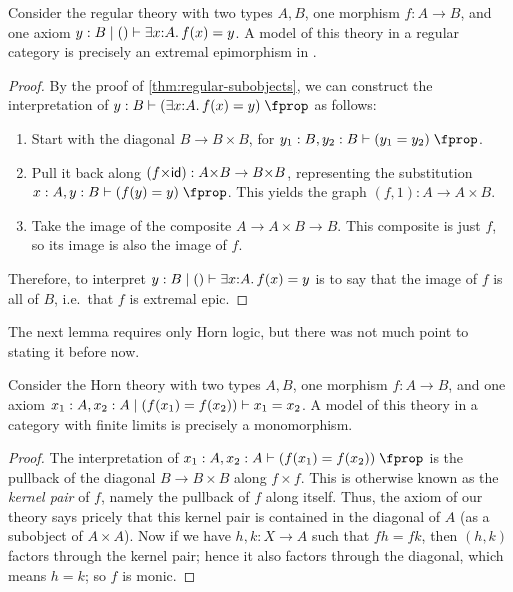 \begin{lem}\label{thm:logic-extremal-epi}
  Consider the regular theory with two types $A,B$, one morphism $f:A\to B$, and one axiom $y:B \cb () \types \exists x:A.f(x)= y$.
  A model of this theory in a regular category \cS is precisely an extremal epimorphism in \cS.
\end{lem}
\begin{proof}
  By the proof of \cref{thm:regular-subobjects}, we can construct the interpretation of $y:B\types (\exists x:A.f(x)= y)\prop$ as follows:
  \begin{enumerate}
  \item Start with the diagonal $B\to B\times B$, for $y_1:B,y_2:B\types (y_1= y_2)\prop$.
  \item Pull it back along $(f\times \idfunc):A\times B\to B\times B$, representing the substitution $x:A,y:B\types (f(y)= y)\prop$.
    This yields the graph $(f,1):A\to A\times B$.
  \item Take the image of the composite $A\to A\times B \to B$.
    This composite is just $f$, so its image is also the image of $f$.
  \end{enumerate}
  Therefore, to interpret $y:B \cb () \types \exists x:A.f(x)= y$ is to say that the image of $f$ is all of $B$, i.e.\ that $f$ is extremal epic.
\end{proof}

The next lemma requires only Horn logic, but there was not much point to stating it before now.

\begin{lem}\label{thm:logic-mono}
  Consider the Horn theory with two types $A,B$, one morphism $f:A\to B$, and one axiom $x_1:A,x_2:A \mid (f(x_1)=f(x_2)) \vdash x_1=x_2$.
  A model of this theory in a category with finite limits is precisely a monomorphism.
\end{lem}
\begin{proof}
  The interpretation of $x_1:A,x_2:A \types (f(x_1)=f(x_2))\prop$ is the pullback of the diagonal $B\to B\times B$ along $f\times f$.
  This is otherwise known as the \emph{kernel pair} of $f$, namely the pullback of $f$ along itself.
  Thus, the axiom of our theory says pricely that this kernel pair is contained in the diagonal of $A$ (as a subobject of $A\times A$).
  Now if we have $h,k:X\to A$ such that $f h = f k$, then $(h,k)$ factors through the kernel pair; hence it also factors through the diagonal, which means $h=k$; so $f$ is monic.
\end{proof}

